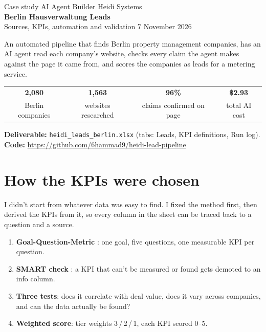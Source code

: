 \documentclass[11pt,a4paper]{article}
\newcommand{\repourl}{https://github.com/6hammad9/heidi-lead-pipeline}
\newcommand{\code}[1]{\texttt{#1}}
\begin{document}
{\color{muted}\small Case study \textbullet{} AI Agent Builder \textbullet{} Heidi Systems}\\[2pt]
{\LARGE\bfseries Berlin Hausverwaltung Leads}\\[4pt]
{\color{muted} Sources, KPIs, automation and validation \textbullet{} 7 November 2026}

\medskip
An automated pipeline that finds Berlin property management companies, has an AI agent read
each company's website, checks every claim the agent makes against the page it came from, and
scores the companies as leads for a metering service.

\begin{center}
\begin{tabular}{cccc}
\toprule
\textbf{2,080} & \textbf{1,563} & \textbf{96\%} & \textbf{\$2.93} \\
Berlin companies & websites researched & claims confirmed on page & total AI cost \\
\bottomrule
\end{tabular}
\end{center}

\textbf{Deliverable:} \code{heidi\_leads\_berlin.xlsx} (tabs: Leads, KPI definitions, Run log).
\textbf{Code:} \url{\repourl}

\section{How the KPIs were chosen}

I didn't start from whatever data was easy to find. I fixed the method first, then derived the
KPIs from it, so every column in the sheet can be traced back to a question and a source.

\begin{enumerate}
  \item \textbf{Goal-Question-Metric} \cite{gqm}: one goal, five questions, one measurable KPI
        per question.
  \item \textbf{SMART check} \cite{smart}: a KPI that can't be measured or found gets demoted to
        an info column.
  \item \textbf{Three tests}: does it correlate with deal value, does it vary across companies,
        and can the data actually be found?
  \item \textbf{Weighted score}: tier weights 3\,/\,2\,/\,1, each KPI scored 0--5.
\end{enumerate}
\end{document}
